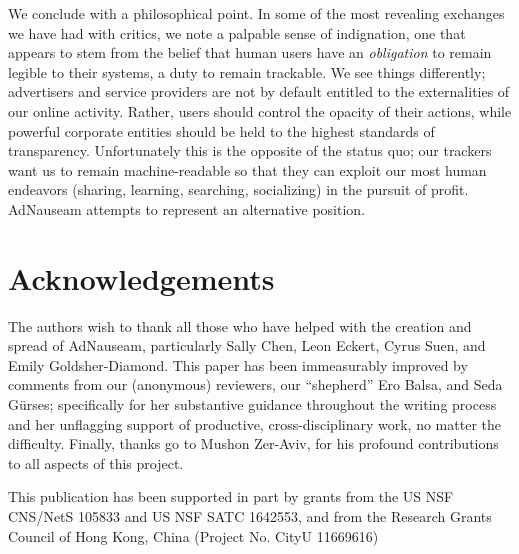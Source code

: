 \documentclass[conference]{IEEEtran}
\begin{document}
We conclude with a philosophical point. In some of the most revealing exchanges we have had with critics, we note a palpable sense of indignation, one that appears to stem from the belief that human users have an \emph{obligation} to remain legible to their systems, a duty to remain trackable. We see things differently; advertisers and service providers are not by default entitled to the externalities of our online activity. Rather, users should control the opacity of their actions, while powerful corporate entities should be held to the highest standards of transparency. Unfortunately this is the opposite of the status quo; our trackers want us to remain machine-readable so that they can exploit our most human endeavors (sharing, learning, searching, socializing) in the pursuit of profit. AdNauseam attempts to represent an alternative position.

\section*{Acknowledgements}
The authors wish to thank all those who have helped with the creation and spread of AdNauseam, particularly Sally Chen, Leon Eckert, Cyrus Suen, and Emily Goldsher-Diamond. This paper has been immeasurably improved by comments from our (anonymous) reviewers, our “shepherd” Ero Balsa, and Seda G\"urses; specifically for her substantive guidance throughout the writing process and her unflagging support of productive, cross-disciplinary work, no matter the difficulty. Finally, thanks go to Mushon Zer-Aviv, for his profound contributions to all aspects of this project.

This publication has been supported in part by grants from the US NSF CNS/NetS 105833 and US NSF SATC 1642553, and from the Research Grants Council of Hong Kong, China (Project No. CityU 11669616)

\end{document}
